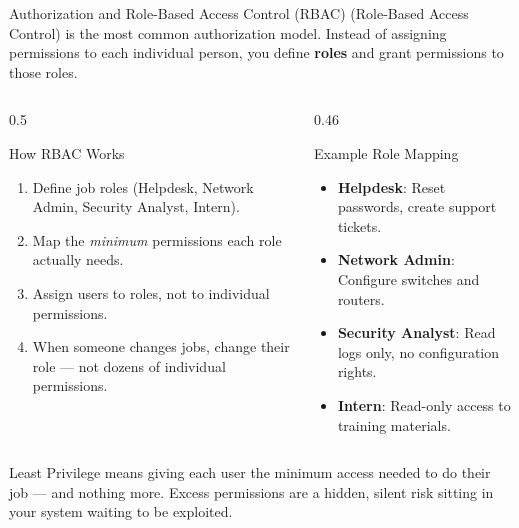 \documentclass[aspectratio=169]{beamer}  %
\begin{document}
\begin{frame}{Authorization and Role-Based Access Control (RBAC)}
    \footnotesize
     (Role-Based Access Control) is the most common authorization model. Instead of assigning permissions to each individual person, you define \textbf{roles} and grant permissions to those roles.

    \vspace{0.4em}
    \begin{columns}[T]
        \begin{column}{0.5\textwidth}
            \begin{block}{How RBAC Works}
                \footnotesize
                \begin{enumerate}
                    \item Define job roles (Helpdesk, Network Admin, Security Analyst, Intern).
                    \item Map the \emph{minimum} permissions each role actually needs.
                    \item Assign users to roles, not to individual permissions.
                    \item When someone changes jobs, change their role --- not dozens of individual permissions.
                \end{enumerate}
            \end{block}
        \end{column}
        \begin{column}{0.46\textwidth}
            \begin{exampleblock}{Example Role Mapping}
                \footnotesize
                \begin{itemize}
                    \item \textbf{Helpdesk}: Reset passwords, create support tickets.
                    \item \textbf{Network Admin}: Configure switches and routers.
                    \item \textbf{Security Analyst}: Read logs only, no configuration rights.
                    \item \textbf{Intern}: Read-only access to training materials.
                \end{itemize}
            \end{exampleblock}
        \end{column}
    \end{columns}

    \vspace{0.3em}
    \begin{alertblock}{Least Privilege}
        \footnotesize
         means giving each user the minimum access needed to do their job --- and nothing more. Excess permissions are a hidden, silent risk sitting in your system waiting to be exploited.
    \end{alertblock}
\end{frame}
\end{document}

